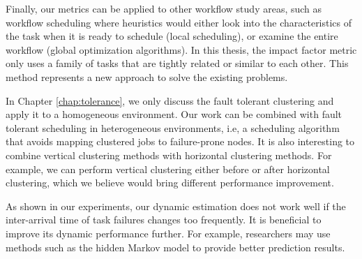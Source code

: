 Finally, our metrics can be applied to other workflow study areas, such as workflow scheduling where heuristics would either look into the characteristics of the task when it is ready to schedule (local scheduling), or examine the entire workflow (global optimization algorithms). In this thesis, the impact factor metric only uses a family of tasks that are tightly related or similar to each other. This method represents a new approach to solve the existing problems. 


In Chapter \ref{chap:tolerance}, we only discuss the fault tolerant clustering and apply it to a homogeneous environment. Our work can be combined with fault tolerant scheduling in heterogeneous environments, i.e, a scheduling algorithm that avoids mapping clustered jobs to failure-prone nodes. It is also interesting to combine vertical clustering methods with horizontal clustering methods. For example, we can perform vertical clustering either before or after horizontal clustering, which we believe would bring different performance improvement. 

As shown in our experiments, our dynamic estimation does not work well if the inter-arrival time of task failures changes too frequently. It is beneficial to improve its dynamic performance further. For example, researchers may use methods such as the hidden Markov model to provide better prediction results. 



 